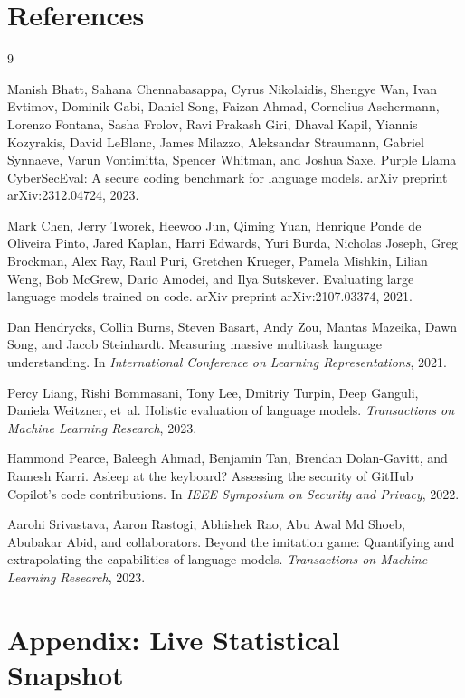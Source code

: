 \documentclass[11pt]{article}
\newcommand{\appendixsnapshot}{%
{\small
\setlength{\tabcolsep}{5pt}
\renewcommand{\arraystretch}{1.06}
\sloppy

}%
}
\begin{document}
\section*{References}
\begin{thebibliography}{9}

Manish Bhatt, Sahana Chennabasappa, Cyrus Nikolaidis, Shengye Wan, Ivan Evtimov, Dominik Gabi, Daniel Song, Faizan Ahmad, Cornelius Aschermann, Lorenzo Fontana, Sasha Frolov, Ravi Prakash Giri, Dhaval Kapil, Yiannis Kozyrakis, David LeBlanc, James Milazzo, Aleksandar Straumann, Gabriel Synnaeve, Varun Vontimitta, Spencer Whitman, and Joshua Saxe.
\newblock Purple Llama CyberSecEval: A secure coding benchmark for language models.
\newblock arXiv preprint arXiv:2312.04724, 2023.

Mark Chen, Jerry Tworek, Heewoo Jun, Qiming Yuan, Henrique Ponde de Oliveira Pinto, Jared Kaplan, Harri Edwards, Yuri Burda, Nicholas Joseph, Greg Brockman, Alex Ray, Raul Puri, Gretchen Krueger, Pamela Mishkin, Lilian Weng, Bob McGrew, Dario Amodei, and Ilya Sutskever.
\newblock Evaluating large language models trained on code.
\newblock arXiv preprint arXiv:2107.03374, 2021.

Dan Hendrycks, Collin Burns, Steven Basart, Andy Zou, Mantas Mazeika, Dawn Song, and Jacob Steinhardt.
\newblock Measuring massive multitask language understanding.
\newblock In \emph{International Conference on Learning Representations}, 2021.

Percy Liang, Rishi Bommasani, Tony Lee, Dmitriy Turpin, Deep Ganguli, Daniela Weitzner, et~al.
\newblock Holistic evaluation of language models.
\newblock \emph{Transactions on Machine Learning Research}, 2023.

Hammond Pearce, Baleegh Ahmad, Benjamin Tan, Brendan Dolan-Gavitt, and Ramesh Karri.
\newblock Asleep at the keyboard? Assessing the security of GitHub Copilot's code contributions.
\newblock In \emph{IEEE Symposium on Security and Privacy}, 2022.

Aarohi Srivastava, Aaron Rastogi, Abhishek Rao, Abu Awal Md Shoeb, Abubakar Abid, and collaborators.
\newblock Beyond the imitation game: Quantifying and extrapolating the capabilities of language models.
\newblock \emph{Transactions on Machine Learning Research}, 2023.

\end{thebibliography}

\appendix
\section*{Appendix: Live Statistical Snapshot}
\appendixsnapshot
\end{document}
